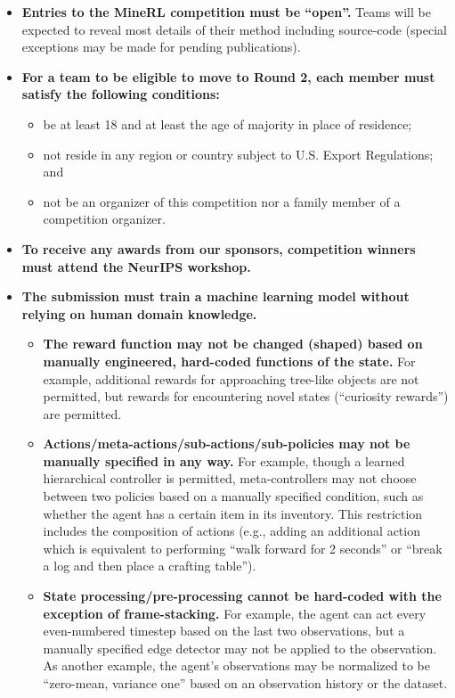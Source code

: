 \begin{itemize}
	\item \textbf{Entries to the MineRL competition must be ``open''.} Teams will be expected to reveal most details of their method including source-code (special exceptions may be made for pending publications).
	\item \textbf{For a team to be eligible to move to Round 2, each member must satisfy the following conditions:}
	\begin{itemize}
	    \item be at least 18 and at least the age of majority in place of residence; 
	    \item not reside in any region or country subject to U.S. Export Regulations; and 
	    \item not be an organizer of this competition nor a family member of a
	    competition organizer. 
	    \end{itemize}
    \item \textbf{To receive any awards from our sponsors, competition winners must attend the NeurIPS workshop.}
    \item \textbf{The submission must train a machine learning model without relying on human domain knowledge.}
    \begin{itemize}
        \item \textbf{The reward function may not be changed (shaped) based on manually engineered, hard-coded functions of the state.} For example, additional rewards for approaching tree-like objects are not permitted, but rewards for encountering novel states (“curiosity rewards”) are permitted.
        \item \textbf{Actions/meta-actions/sub-actions/sub-policies may not be manually specified in any way.} For example, though a learned hierarchical controller is permitted, meta-controllers may not choose between two policies based on a manually specified condition, such as whether the agent has a certain item in its inventory. This restriction includes the composition of actions (e.g., adding an additional action which is equivalent to performing “walk forward for 2 seconds” or “break a log and then place a crafting table”).
        \item \textbf{State processing/pre-processing cannot be hard-coded with the exception of frame-stacking.} For example, the agent can act every even-numbered timestep based on the last two observations, but a manually specified edge detector may not be applied to the observation. As another example, the agent’s observations may be normalized to be “zero-mean, variance one” based on an observation history or the dataset.

\end{itemize}
\end{itemize}
